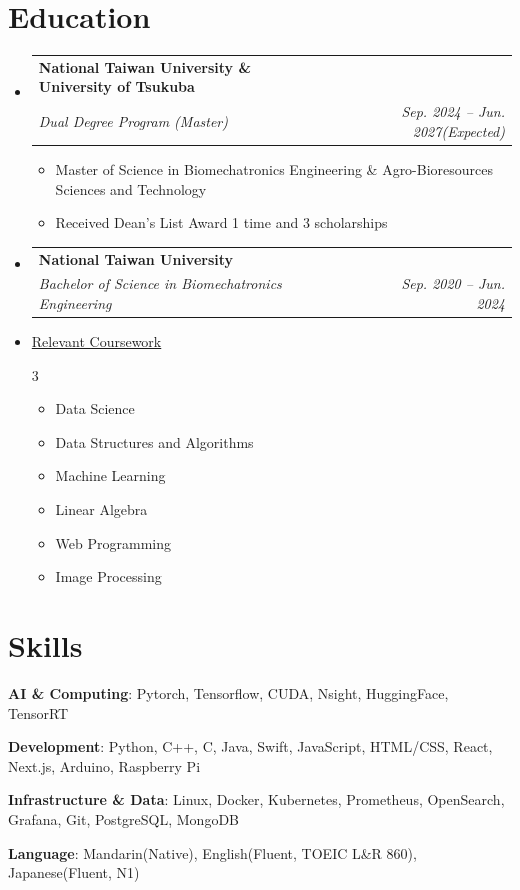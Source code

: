 \documentclass[letterpaper,11pt]{article}
\makeatletter
\newcommand{\resumeItem}[1]{
  \item\small{
    {#1 \vspace{-2pt}}
  }
}
\newcommand{\resumeSubheading}[4]{
  \vspace{-2pt}\item
    \begin{tabular*}{0.97\textwidth}[t]{l@{\extracolsep{\fill}}r}
      \textbf{#1} & #2 \\
      \textit{\small#3} & \textit{\small #4} \\
    \end{tabular*}\vspace{-7pt}
}
\newcommand{\resumeSubHeadingListStart}{\begin{itemize}[leftmargin=0.15in, label={}]}
\newcommand{\resumeSubHeadingListEnd}{\end{itemize}}
\newcommand{\resumeItemListStart}{\begin{itemize}}
\newcommand{\resumeItemListEnd}{\end{itemize}\vspace{-5pt}}
\makeatother
\begin{document}
\section{Education}
  \resumeSubHeadingListStart
    \resumeSubheading
      {National Taiwan University \& University of Tsukuba}{}
      {Dual Degree Program (Master)}{Sep. 2024 -- Jun. 2027(Expected)}
      \resumeItemListStart
        \resumeItem{Master of Science in Biomechatronics Engineering \& Agro-Bioresources Sciences and Technology}
        \resumeItem{Received Dean's List Award 1 time and 3 scholarships}
      \resumeItemListEnd
    \resumeSubheading
      {National Taiwan University}{}
      {Bachelor of Science in Biomechatronics Engineering}{Sep. 2020 -- Jun. 2024}
      \item[] \small{\underline{Relevant Coursework}}
      \begin{multicols}{3}
        \begin{itemize}[leftmargin=0.15in]
          \item Data Science
          \item Data Structures and Algorithms
          \item Machine Learning
          \item Linear Algebra
          \item Web Programming
          \item Image Processing
        \end{itemize}
      \end{multicols}
  \resumeSubHeadingListEnd

\section{Skills}
 \begin{itemize}[leftmargin=0.15in, label={}]
    \small{\item{
     \textbf{AI \& Computing}{: Pytorch, Tensorflow, CUDA, Nsight, HuggingFace, TensorRT} \\
    }}
    \small{\item{
     \textbf{Development}{: Python, C++, C, Java, Swift, JavaScript, HTML/CSS, React, Next.js, Arduino, Raspberry Pi} \\
    }}
    \small{\item{
     \textbf{Infrastructure \& Data}{: Linux, Docker, Kubernetes, Prometheus, OpenSearch, Grafana, Git, PostgreSQL, MongoDB} \\
    }}
    \small{\item{
     \textbf{Language}{: Mandarin(Native), English(Fluent, TOEIC L\&R 860), Japanese(Fluent, N1)} \\
    }}
 \end{itemize}
\end{document}
